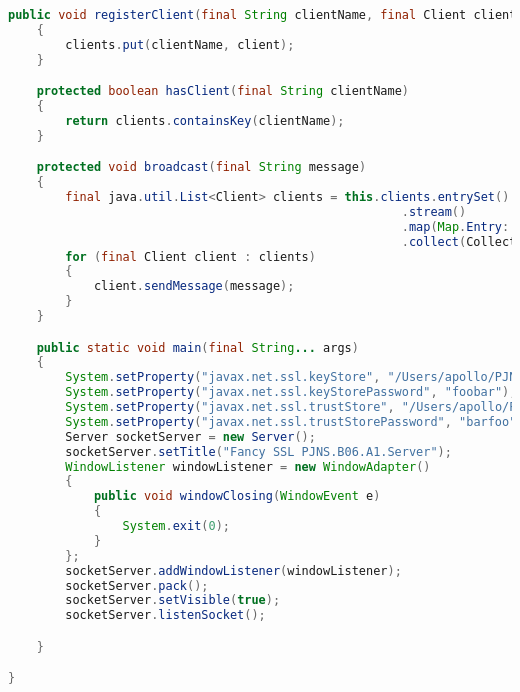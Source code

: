 \documentclass[twoside]{article}
\begin{document}
\begin{lstlisting}[language=Java]
    public void registerClient(final String clientName, final Client client)
    {
        clients.put(clientName, client);
    }

    protected boolean hasClient(final String clientName)
    {
        return clients.containsKey(clientName);
    }

    protected void broadcast(final String message)
    {
        final java.util.List<Client> clients = this.clients.entrySet()
                                                       .stream()
                                                       .map(Map.Entry::getValue)
                                                       .collect(Collectors.toList());
        for (final Client client : clients)
        {
            client.sendMessage(message);
        }
    }

    public static void main(final String... args)
    {
        System.setProperty("javax.net.ssl.keyStore", "/Users/apollo/PJNS/SSL-Server/privateKeys.store");
        System.setProperty("javax.net.ssl.keyStorePassword", "foobar");
        System.setProperty("javax.net.ssl.trustStore", "/Users/apollo/PJNS/SSL-Server/publicKeys.store");
        System.setProperty("javax.net.ssl.trustStorePassword", "barfoo");
        Server socketServer = new Server();
        socketServer.setTitle("Fancy SSL PJNS.B06.A1.Server");
        WindowListener windowListener = new WindowAdapter()
        {
            public void windowClosing(WindowEvent e)
            {
                System.exit(0);
            }
        };
        socketServer.addWindowListener(windowListener);
        socketServer.pack();
        socketServer.setVisible(true);
        socketServer.listenSocket();

    }

}
		\end{lstlisting}
\end{document}
